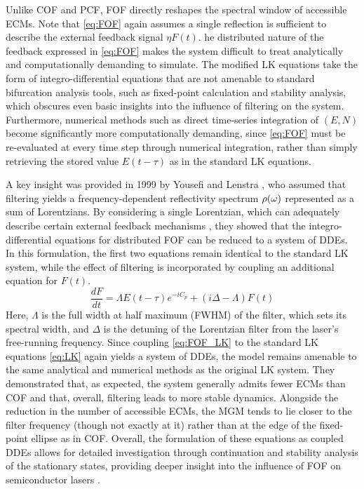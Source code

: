 Unlike COF and PCF, FOF directly reshapes the spectral window of accessible ECMs.
Note that \eqref{eq:FOF} again assumes a single reflection is sufficient to describe the external feedback signal $\eta F(t)$.
he distributed nature of the feedback expressed in \eqref{eq:FOF} makes the system difficult to treat analytically and computationally demanding to simulate.
The modified LK equations take the form of integro-differential equations that are not amenable to standard bifurcation analysis tools, such as fixed-point calculation and stability analysis, which obscures even basic insights into the influence of filtering on the system.
Furthermore, numerical methods such as direct time-series integration of $(E,N)$ become significantly more computationally demanding, since \eqref{eq:FOF} must be re-evaluated at every time step through numerical integration, rather than simply retrieving the stored value $E(t-\tau)$ as in the standard LK equations.
%
\par
%
A key insight was provided in 1999 by Yousefi and Lenstra \cite{yousefi1999dynamical}, who assumed that filtering yields a frequency-dependent reflectivity spectrum $\rho(\omega)$ represented as a sum of Lorentzians.
By considering a single Lorentzian, which can adequately describe certain external feedback mechanisms \cite{dahmani1987frequency,detienne1997semiconductor}, they showed that the integro-differential equations for distributed FOF can be reduced to a system of DDEs.
In this formulation, the first two equations remain identical to the standard LK system, while the effect of filtering is incorporated by coupling an additional equation for $F(t)$.
%
\begin{equation}
\label{eq:FOF_LK}
    \frac{d F}{d t} = \Lambda E(t-\tau) e^{-i C_p}+(i \Delta-\Lambda) F(t)
\end{equation}
%
Here, $\Lambda$ is the full width at half maximum (FWHM) of the filter, which sets its spectral width, and $\Delta$ is the detuning of the Lorentzian filter from the laser’s free-running frequency.
Since coupling \eqref{eq:FOF_LK} to the standard LK equations \eqref{eq:LK} again yields a system of DDEs, the model remains amenable to the same analytical and numerical methods as the original LK system.
They demonstrated that, as expected, the system generally admits fewer ECMs than COF and that, overall, filtering leads to more stable dynamics.
Alongside the reduction in the number of accessible ECMs, the MGM tends to lie closer to the filter frequency (though not exactly at it) rather than at the edge of the fixed-point ellipse as in COF.
Overall, the formulation of these equations as coupled DDEs allows for detailed investigation through continuation and stability analysis of the stationary states, providing deeper insight into the influence of FOF on semiconductor lasers 
\cite{erzgraber2006frequency, erzgraber2007bifurcation, erzgraber2007dynamics, fischer2000experimental, fischer2004experimental, green2006mode, 
hek2007semiconductor, erzgraber2007feedback, fischer2004filtered, yousefi2001global, yousefi2002simulations, yousefi2003nonlinear}. 
%
%
